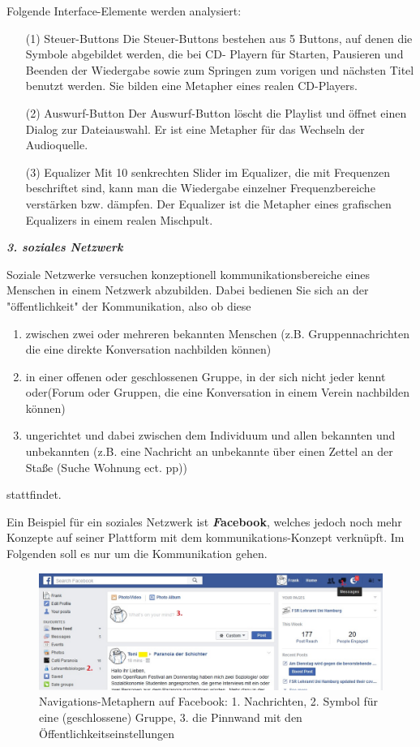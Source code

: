 \documentclass[a4paper,10pt]{article}
\begin{document}
Folgende Interface-Elemente werden analysiert:
\begin{enumerate}
\item[(1)] Steuer-Buttons
	Die Steuer-Buttons bestehen aus 5 Buttons, auf denen die Symbole abgebildet werden, die bei CD-  	Playern für Starten, Pausieren und Beenden der Wiedergabe sowie zum Springen zum vorigen und 		nächsten Titel benutzt werden. Sie bilden eine Metapher eines realen CD-Players.
\item[(2)] Auswurf-Button
	Der Auswurf-Button löscht die Playlist und öffnet einen Dialog zur Dateiauswahl. Er ist eine 		Metapher für das Wechseln der Audioquelle.
\item[(3)] Equalizer
	Mit	10 senkrechten Slider im Equalizer, die mit Frequenzen beschriftet sind, kann man die 			Wiedergabe einzelner Frequenzbereiche verstärken bzw. dämpfen. Der Equalizer ist die Metapher 		eines grafischen Equalizers in einem realen Mischpult.
\end{enumerate}

\textbf{\textit{3. soziales Netzwerk}} \newline

Soziale Netzwerke versuchen konzeptionell kommunikationsbereiche eines Menschen in einem Netzwerk abzubilden. Dabei bedienen Sie sich an der "öffentlichkeit" der Kommunikation, also ob diese
\begin{enumerate}
\item zwischen zwei oder mehreren bekannten Menschen (z.B. Gruppennachrichten die eine direkte Konversation nachbilden können)
\item in einer offenen oder geschlossenen Gruppe, in der sich nicht jeder kennt oder(Forum oder Gruppen, die eine Konversation in einem Verein nachbilden können)
\item ungerichtet und dabei zwischen dem Individuum und allen bekannten und unbekannten (z.B. eine Nachricht an unbekannte über einen Zettel an der Staße (Suche Wohnung ect. pp))
\end{enumerate}

stattfindet. \newline

Ein Beispiel für ein soziales Netzwerk ist \textbf{\textit Facebook}, welches jedoch noch mehr Konzepte auf seiner Plattform mit dem kommunikations-Konzept verknüpft. Im Folgenden soll es nur um die Kommunikation gehen.

\begin{figure}[ht]
\centering \includegraphics[width=1\textwidth]{facebook.jpg}
\caption{Navigations-Metaphern auf Facebook: 1. Nachrichten, 2. Symbol für eine (geschlossene) Gruppe, 3. die Pinnwand mit den Öffentlichkeitseinstellungen}
\end{figure}
\end{document}
